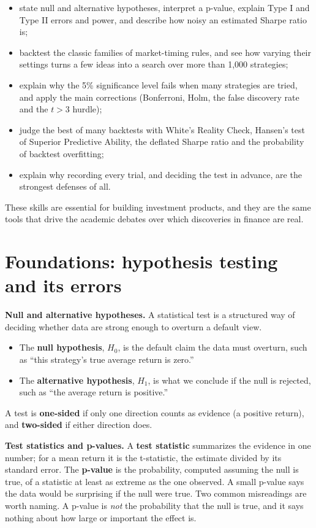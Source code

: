\begin{itemize}
  \item state null and alternative hypotheses, interpret a p-value, explain Type I and Type II errors and power, and describe how noisy an estimated Sharpe ratio is;
  \item backtest the classic families of market-timing rules, and see how varying their settings turns a few ideas into a search over more than 1,000 strategies;
  \item explain why the 5\% significance level fails when many strategies are tried, and apply the main corrections (Bonferroni, Holm, the false discovery rate and the $t > 3$ hurdle);
  \item judge the best of many backtests with White's Reality Check, Hansen's test of Superior Predictive Ability, the deflated Sharpe ratio and the probability of backtest overfitting;
  \item explain why recording every trial, and deciding the test in advance, are the strongest defenses of all.
\end{itemize}

These skills are essential for building investment products, and they are
the same tools that drive the academic debates over which discoveries in finance are real.

\section{Foundations: hypothesis testing and its errors}
\label{sec:04-foundations}

\textbf{Null and alternative hypotheses.} A statistical test is a structured way of deciding whether data are strong enough to overturn a default view.

\begin{itemize}
  \item The \textbf{null hypothesis}, $H_0$, is the default claim the data must overturn, such as ``this strategy's true average return is zero.''
  \item The \textbf{alternative hypothesis}, $H_1$, is what we conclude if the null is rejected, such as ``the average return is positive.''
\end{itemize}

A test is \textbf{one-sided} if only one direction counts as evidence (a positive return), and \textbf{two-sided} if either direction does.

\textbf{Test statistics and p-values.} A \textbf{test statistic} summarizes the evidence in one number; for a mean return it is the t-statistic, the estimate divided by its standard error. The \textbf{p-value} is the probability, computed assuming the null is true, of a statistic at least as extreme as the one observed. A small p-value says the data would be surprising if the null were true. Two common misreadings are worth naming. A p-value is \emph{not} the probability that the null is true, and it says nothing about how large or important the effect is.

